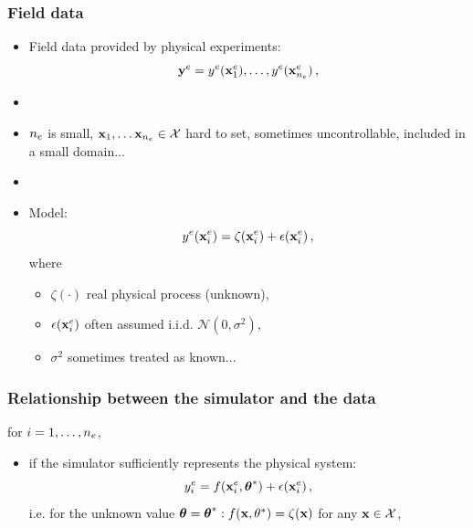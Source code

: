 \documentclass[nopagenumber,9pt]{beamer}
\begin{document}
\begin{frame}
\frametitle{Field data}
 
 \begin{itemize}
  \item Field data provided by physical experiments:
  $$\mathbf{y}^{e}=y^{e}(\mathbf{x}^e_1),\ldots,y^{e}(\mathbf{x}^e_{n_e})\,,$$
\item[]
  \item $n_e$ is small, $\mathbf{x}_1,\ldots \mathbf{x}_{n_e} \in \mathcal{X}$ hard to set, sometimes uncontrollable, included in a small domain...
  \item[]
  \item Model:
  $$y^{e}(\mathbf{x}^e_i)=\zeta(\mathbf{x}^e_i)+\epsilon(\mathbf{x}^e_i)\,,$$
  where 
  \begin{itemize}
   \item $\zeta(\cdot)$ real physical process (unknown),
   \item $\epsilon(\mathbf{x}^e_i)$ often assumed i.i.d. $\mathcal{N}(0,\sigma^2)$,
   \item $\sigma^2$ sometimes treated as known...
  \end{itemize}

  
  
  \end{itemize}

 
\end{frame}





\begin{frame}
 \frametitle{Relationship between the simulator and the data}

 for $i=1,\ldots, n_e$,
\begin{itemize}
 \item if the simulator sufficiently represents the physical system:
 \begin{equation}
  \label{nodisc}
 y^{e}_i=f(\mathbf{x}^e_i,\boldsymbol{\theta}^*)+\epsilon(\mathbf{x}^e_i)\,,
 \end{equation}
 i.e. for the unknown value $\boldsymbol{\theta}=\boldsymbol{\theta}^*: f(\mathbf{x},\theta^*)=\zeta(\mathbf{x}) $ for any $\mathbf{x}\in \mathcal{X}$,

 \end{itemize}
 
 \end{frame}
\end{document}

